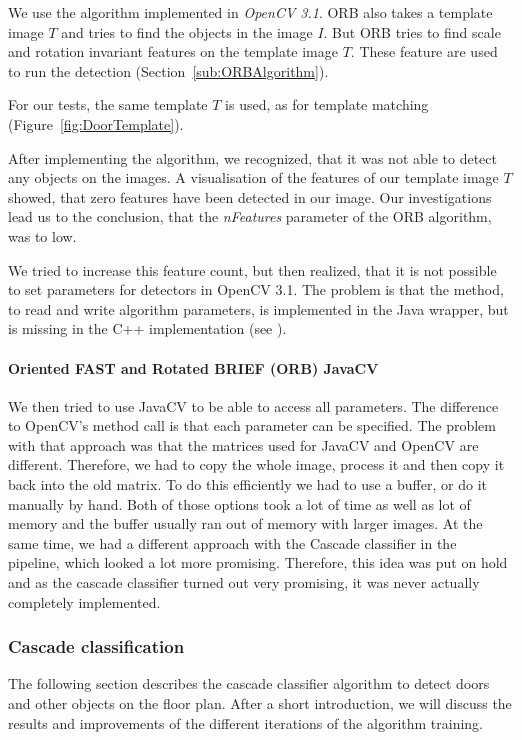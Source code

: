 We use the algorithm implemented in \textit{OpenCV 3.1}. ORB also takes a template image $T$ and tries to find the objects in the image $I$. But ORB tries to find scale and rotation invariant features on the template image $T$. These feature are used to run the detection (Section~\ref{sub:ORBAlgorithm}). 

For our tests, the same template $T$ is used, as for template matching (Figure~\ref{fig:DoorTemplate}).

After implementing the algorithm, we recognized, that it was not able to detect any objects on the images. A visualisation of the features of our template image $T$ showed, that zero features have been detected in our image. Our investigations lead us to the conclusion, that the \textit{nFeatures} parameter of the ORB algorithm, was to low.

We tried to increase this feature count, but then realized, that it is not possible to set parameters for detectors in OpenCV 3.1. The problem is that the method, to read and write algorithm parameters, is implemented in the Java wrapper, but is missing in the C++ implementation (see \citep{orb}).

\paragraph{Oriented FAST and Rotated BRIEF (ORB) JavaCV}
\label{sub:ImpORBJVCV}
We then tried to use JavaCV to be able to access all parameters. The difference to OpenCV's method call is that each parameter can be specified. The problem with that approach was that the matrices used for JavaCV and OpenCV are different. Therefore, we had to copy the whole image, process it and then copy it back into the old matrix. To do this efficiently we had to use a buffer, or do it manually by hand. Both of those options took a lot of time as well as lot of memory and the buffer usually ran out of memory with larger images. At the same time, we had a different approach with the Cascade classifier in the pipeline, which looked a lot more promising. Therefore, this idea was put on hold and as the cascade classifier turned out very promising, it was never actually completely implemented.

\subsubsection{Cascade classification}
\label{sub:ImpCascadeClassifier}
The following section describes the cascade classifier algorithm to detect doors and other objects on the floor plan. After a short introduction, we will discuss the results and improvements of the different iterations of the algorithm training.

